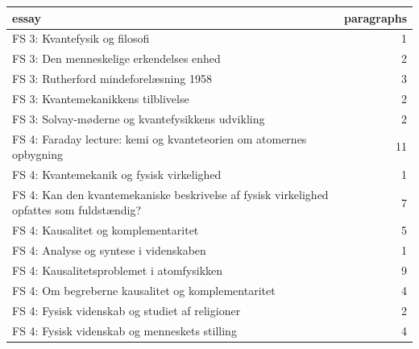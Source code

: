 \documentclass[11pt]{article}
\begin{document}
\begin{center}\begin{tabular}{@{}p{}r@{}}\toprule essay & paragraphs\\\midrule
FS 3: Kvantefysik og filosofi & 1\\
FS 3: Den menneskelige erkendelses enhed & 2\\
FS 3: Rutherford mindeforelæsning 1958 & 3\\
FS 3: Kvantemekanikkens tilblivelse & 2\\
FS 3: Solvay-møderne og kvantefysikkens udvikling & 2\\
FS 4: Faraday lecture: kemi og kvanteteorien om atomernes opbygning & 11\\
FS 4: Kvantemekanik og fysisk virkelighed & 1\\
FS 4: Kan den kvantemekaniske beskrivelse af fysisk virkelighed opfattes som fuldstændig? & 7\\
FS 4: Kausalitet og komplementaritet & 5\\
FS 4: Analyse og syntese i videnskaben & 1\\
FS 4: Kausalitetsproblemet i atomfysikken & 9\\
FS 4: Om begreberne kausalitet og komplementaritet & 4\\
FS 4: Fysisk videnskab og studiet af religioner & 2\\
FS 4: Fysisk videnskab og menneskets stilling & 4\\
\bottomrule\end{tabular}\end{center}
\end{document}
